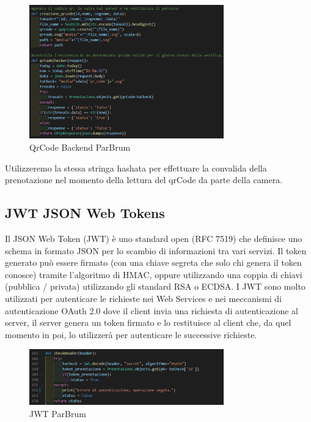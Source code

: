\documentclass[a4paper,11pt]{report}
\begin{document}
\begin{figure}[H]
    \centering
    \includegraphics[width=0.75\textwidth]{qr_py.png}
    \caption{QrCode Backend ParBrum}
    \label{fig:qrCode Backend}
\end{figure}
Utilizzeremo la stessa stringa hashata per effettuare la convalida della prenotazione nel momento della lettura del qrCode da parte della camera.

\subsection{ JWT JSON Web Tokens}
Il JSON Web Token (JWT) è uno standard open (RFC 7519) che definisce uno schema in formato JSON per lo scambio di informazioni tra vari servizi.
Il token generato può essere firmato (con una chiave segreta che solo chi genera il token conosce) tramite l’algoritmo di HMAC, oppure utilizzando una coppia di chiavi (pubblica / privata) utilizzando gli standard RSA o ECDSA.
I JWT sono molto utilizzati per autenticare le richieste nei Web Services e nei meccanismi di autenticazione OAuth 2.0 dove il client invia una richiesta di autenticazione al server, il server genera un token firmato e lo restituisce al client che, da quel momento in poi, lo utilizzerà per autenticare le successive richieste.

\begin{figure}[H]
    \centering
    \includegraphics[width=0.75\textwidth]{jwt_py.png}
    \caption{JWT ParBrum}
    \label{fig:jwtBackend}
\end{figure}
\end{document}
